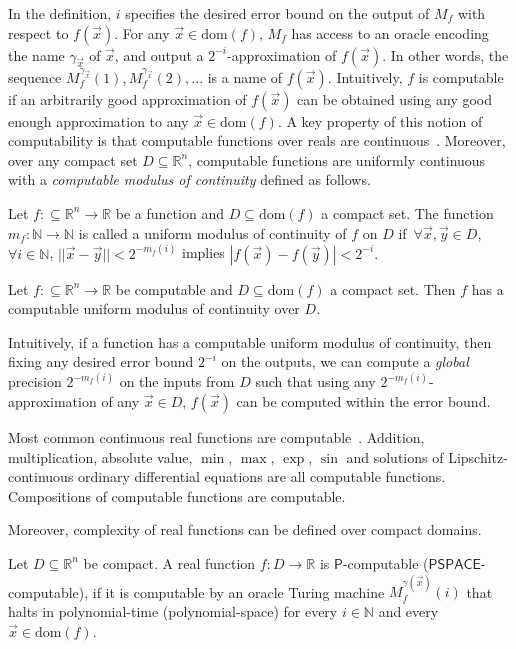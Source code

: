 \documentclass[prodmode]{acmsmall} %
\newcommand{\dom}{\mathrm{dom}}
\begin{document}
In the definition, $i$ specifies the desired error bound on the output of $M_f$ with respect to $f(\vec x)$. For any $\vec x\in \dom(f)$, $M_f$ has access to an oracle encoding the name $\gamma_{\vec x}$ of $\vec x$, and output a $2^{-i}$-approximation of $f(\vec x)$. In other words, the sequence $M_f^{\gamma_{\vec x}}(1), M_f^{\gamma_{\vec x}}(2), ...$ is a name of $f(\vec x)$. Intuitively, $f$ is computable if an arbitrarily good approximation of $f(\vec x)$ can be obtained using any good enough approximation to any $\vec x\in\dom(f)$. A key property of this notion of computability is that computable functions over reals are continuous~\cite{CAbook}. Moreover, over any compact set $D\subseteq \mathbb{R}^n$, computable functions are uniformly continuous with a {\em computable modulus of continuity} defined as follows. 
\begin{definition}
Let $f:\subseteq \mathbb{R}^n\rightarrow \mathbb{R}$ be a function and $D\subseteq\dom(f)$ a compact set. The function $m_f: \mathbb{N}\rightarrow \mathbb{N}$ is called a uniform modulus of continuity of $f$ on $D$ if\ $\forall \vec x,\vec y\in D$, $\forall i\in \mathbb{N}$, $||\vec x-\vec y||<2^{-m_f(i)}$ implies $|f(\vec x)-f(\vec y)|<2^{-i}.$
\end{definition}
\begin{proposition}
Let $f:\subseteq\mathbb{R}^n\rightarrow \mathbb{R}$ be computable and $D\subseteq\dom(f)$ a compact set. Then $f$ has a computable uniform modulus of continuity over $D$.
\end{proposition}
Intuitively, if a function has a computable uniform modulus of continuity, then fixing any desired error bound $2^{-i}$ on the outputs, we can compute a {\em global} precision $2^{-m_f(i)}$ on the inputs from $D$ such that using any $2^{-m_f(i)}$-approximation of any $\vec x\in D$, $f(\vec x)$ can be computed within the error bound. 

Most common continuous real functions are computable~\cite{CAbook}. Addition, multiplication, absolute value, $\min$, $\max$, $\exp$, $\sin$ and solutions of Lipschitz-continuous ordinary differential equations are all computable functions. Compositions of computable functions are computable.

Moreover, complexity of real functions can be defined over compact domains. 
\begin{definition}[\cite{Ko92}]
Let $D\subseteq \mathbb{R}^n$ be compact. A real function $f:D\rightarrow\mathbb{R}$ is $\mathsf{P}$-computable ($\mathsf{PSPACE}$-computable), if it is computable by an oracle Turing machine $M_{f}^{\gamma(\vec x)}(i)$ that halts in polynomial-time (polynomial-space) for every $i\in \mathbb{N}$ and every $\vec x\in \dom(f)$. 
\end{definition}
\end{document}
